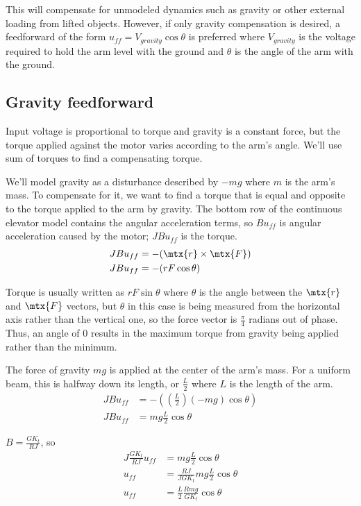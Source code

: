 This will compensate for unmodeled dynamics such as gravity or other external
loading from lifted objects. However, if only gravity compensation is desired,
a feedforward of the form $u_{ff} = V_{gravity} \cos\theta$ is preferred where
$V_{gravity}$ is the voltage required to hold the arm level with the ground and
$\theta$ is the angle of the arm with the ground.

\subsection{Gravity feedforward}

Input voltage is proportional to torque and gravity is a constant force, but the
torque applied against the motor varies according to the arm's angle. We'll use
sum of torques to find a compensating torque.

We'll model gravity as a disturbance described by $-mg$ where $m$ is the arm's
mass. To compensate for it, we want to find a torque that is equal and opposite
to the torque applied to the arm by gravity. The bottom row of the continuous
elevator model contains the angular acceleration terms, so $Bu_{ff}$ is angular
acceleration caused by the motor; $JBu_{ff}$ is the torque.
\begin{align*}
  J Bu_{ff} &= -(\mtx{r}\times\mtx{F}) \\
  J Bu_{ff} &= -(rF\cos\theta)
\end{align*}

Torque is usually written as $rF\sin\theta$ where $\theta$ is the angle between
the $\mtx{r}$ and $\mtx{F}$ vectors, but $\theta$ in this case is being measured
from the horizontal axis rather than the vertical one, so the force vector is
$\frac{\pi}{4}$ radians out of phase. Thus, an angle of $0$ results in the
maximum torque from gravity being applied rather than the minimum.

The force of gravity $mg$ is applied at the center of the arm's mass. For a
uniform beam, this is halfway down its length, or $\frac{L}{2}$ where $L$ is the
length of the arm.
\begin{align*}
  J Bu_{ff} &= -\left(\left(\frac{L}{2}\right)(-mg)\cos\theta\right) \\
  J Bu_{ff} &= mg \frac{L}{2}\cos\theta
\end{align*}

$B = \frac{GK_t}{RJ}$, so
\begin{align*}
  J \frac{GK_t}{RJ} u_{ff} &= mg \frac{L}{2}\cos\theta \\
  u_{ff} &= \frac{RJ}{JGK_t} mg \frac{L}{2}\cos\theta \\
  u_{ff} &= \frac{L}{2} \frac{Rmg}{GK_t}\cos\theta
\end{align*}

